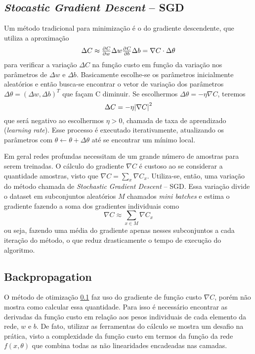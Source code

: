 \subsection{\textit{Stocastic Gradient Descent} -- SGD}
\label{sec:sgd}
Um método tradicional para minimização é o do gradiente descendente, que utiliza a aproximação
\begin{equation}
\Delta C \approx \pd{C}{w} \Delta w \pd{C}{b} \Delta b = \nabla C \cdot \Delta \theta
\end{equation}
para verificar a variação $\Delta C$ na função custo em função da variação nos parâmetros de $\Delta w$ e $\Delta b$. Basicamente escolhe-se os parâmetros inicialmente aleatórios e então busca-se encontrar o vetor de variação dos parâmetros $\Delta \theta = (\Delta w, \Delta b)^T$ que façam C diminuir. Se escolhermos $\Delta \theta = -\eta \nabla C$, teremos
\begin{equation}
\Delta C = -\eta \abs{\nabla C}^2
\end{equation}
que será negativo ao escolhermos $\eta > 0$, chamada de taxa de aprendizado (\textit{learning rate}). Esse processo é executado iterativamente, atualizando os parâmetros com $\theta \gets \theta + \Delta \theta$ até se encontrar um mínimo local.

Em geral redes profundas necessitam de um grande número de amostras para serem treinadas. O cálculo do gradiente $\nabla C$ é custoso ao se considerar a quantidade amostras, visto que $\nabla C = \sum_x \nabla C_x$. Utiliza-se, então, uma variação do método chamada de \textit{Stochastic Gradient Descent} -- SGD. Essa variação divide o dataset em subconjuntos aleatórios $M$ chamados \textit{mini batches} e estima o gradiente fazendo a soma dos gradientes individuais como
\begin{equation}
\nabla C \approx \sum_{x \in M} \nabla C_x
\end{equation}
ou seja, fazendo uma média do gradiente apenas nesses subconjuntos a cada iteração do método, o que reduz drasticamente o tempo de execução do algoritmo.

\subsection{Backpropagation}

O método de otimização \ref{sec:sgd} faz uso do gradiente de função custo $\nabla C$, porém não mostra como calcular essa quantidade. Para isso é necessário encontrar as derivadas da função custo em relação aos pesos individuais de cada elemento da rede, $w$ e $b$. De fato, utilizar as ferramentas do cálculo se mostra um desafio na prática, visto a complexidade da função custo em termos da função da rede $f(x, \theta)$ que combina todas as não linearidades encadeadas nas camadas. 

